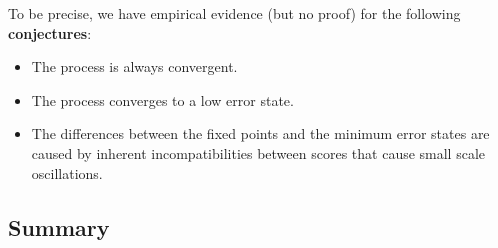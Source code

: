 \documentclass[12pt,a4paper]{article}
\begin{document}
To be precise, we have empirical evidence (but no proof) for the following {\bf{conjectures}}:

\begin{itemize}
\item The process is always convergent.
\item The process converges to a low error state.
\item The differences between the fixed points and the minimum error states are caused by inherent incompatibilities between scores  that cause small scale oscillations.
\end{itemize}

\subsection{Summary}
\end{document}
